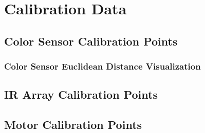 \documentclass[12pt]{report}
\begin{document}
\chapter{Calibration Data}

\section{Color Sensor Calibration Points}
\label{sc:color-sensor-points}


\subsection{Color Sensor Euclidean Distance Visualization}
\label{sc:color-sensor-visualization}


\section{IR Array Calibration Points}
\label{sc:ir-array-points}


\section{Motor Calibration Points}
\label{sc:motor-points}

\end{document}
